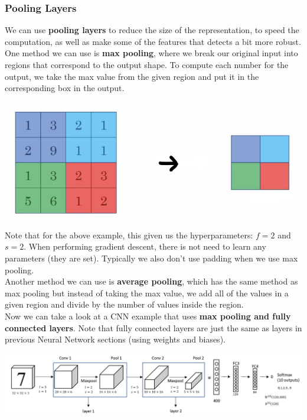 \documentclass[11pt, a4paper]{article}
\begin{document}
\begin{spacing}{1.1}
	\subsubsection{Pooling Layers}
	We can use \textbf{pooling layers} to reduce the size of the representation, to speed the computation, as well as make some of the features that detects a bit more robust. \vspace*{1.5mm}\\
	One method we can use is \textbf{max pooling}, where we break our original input into regions that correspond to the output shape. To compute each number for the output, we take the max value from the given region and put it in the corresponding box in the output. 
	\begin{center}	\includegraphics[scale=.4]{max_ppol} \end{center}
	Note that for the above example, this given us the hyperparameters: $f=2$ and $s=2$. When performing gradient descent, there is not need to learn any parameters (they are set). Typically we also don't use padding when we use max pooling. \vspace*{2mm}\\
	Another method we can use is \textbf{average pooling}, which has the same method as max pooling but instead of taking the max value, we add all of the values in a given region and divide by the number of values inside the region. \vspace*{2mm}\\
	Now we can take a look at a CNN example that uses \textbf{max pooling and fully connected layers}. Note that fully connected layers are just the same as layers in previous Neural Network sections (using weights and biases).
	\begin{center}
		\includegraphics[scale=.33]{pool_ex}

\end{center}
\end{spacing}
\end{document}
